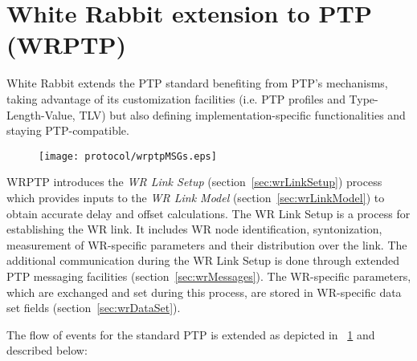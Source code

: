 \section{White Rabbit extension to PTP (WRPTP)}
\label{sec:wrptp}

White Rabbit extends the PTP standard benefiting from PTP's mechanisms, 
taking advantage of its customization facilities (i.e. PTP profiles
and Type-Length-Value, TLV) but also defining implementation-specific 
functionalities and staying PTP-compatible. 


\begin{figure}[!t]
\centering
\texttt{[image: protocol/wrptpMSGs.eps]}
\caption{}
\label{fig:wrptpMSGs}
\end{figure}

WRPTP introduces the \textit{WR Link Setup} (section~\ref{sec:wrLinkSetup}) process which
provides inputs to the \textit{WR Link  Model} (section~\ref{sec:wrLinkModel}) 
to obtain accurate delay and offset calculations. 
The WR Link Setup is a process for establishing the WR link. It includes WR node
identification, syntonization, measurement of WR-specific parameters and 
their distribution over the link. The additional communication during the WR Link Setup 
is done through extended PTP messaging facilities (section~\ref{sec:wrMessages}). 
The WR-specific parameters, which are exchanged and set during this process, are 
stored in WR-specific data set fields (section~\ref{sec:wrDataSet}). 

The flow of events for the standard PTP is extended as depicted in \figurename~\ref{fig:wrptpMSGs}
and described below:

